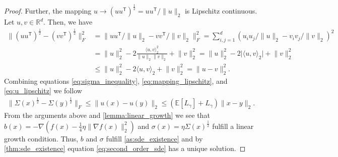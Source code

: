 \documentclass[12pt]{article}
\theoremstyle{definition}
\numberwithin{equation}{section}
\newcommand{\R}{\mathbb{R}}
\newcommand{\T}{\mathsf{T}}
\newcommand{\ev}[1]{\mathbb{E}\left[{#1}\right]}
\newcommand{\norm}[1]{\lVert{#1}\rVert_2}
\newcommand{\normf}[1]{\lVert{#1}\rVert_F}
\newcommand{\scp}[2]{\langle{#1}, {#2}\rangle_2}
\begin{document}
\begin{proof}
  Further, the mapping $u \rightarrow (uu^\T)^{\frac{1}{2}} = uu^\T/\norm{u}$ is Lipschitz continuous. Let $u,v \in \R^d$. Then, we have
  \begin{equation}
    \label{eq:mapping_lipschitz}
    \begin{split}
    \normf{(uu^\T)^{\frac{1}{2}} - (vv^\T)^{\frac{1}{2}}}^2 &= \normf{uu^\T/\norm{u} - vv^\T/\norm{v}}^2 = \sum_{i,j = 1}^d (u_iu_j/\norm{u} - v_iv_j/\norm{v})^2 \\
    &= \norm{u}^2 - 2 \frac{\scp{u}{v}^2}{\norm{u}\norm{v}} + \norm{v}^2 = \norm{u}^2 - 2 \lvert \scp{u}{v} \rvert+ \norm{v}^2 \\
    &\leq \norm{u}^2 - 2 \scp{u}{v} + \norm{v}^2 = \norm{u-v}^2.
    \end{split}
  \end{equation}
  Combining equations \eqref{eq:sigma_inequality}, \eqref{eq:mapping_lipschitz}, and \eqref{eq:u_lipschitz} we follow
  \begin{align*}
    \normf{\Sigma(x)^{\frac{1}{2}} - \Sigma(y)^{\frac{1}{2}}} \leq \norm{u(x) - u(y)} \leq \left(\ev{L_{\gamma}} + L_{\gamma}\right)\norm{x-y}.
  \end{align*}
  From the arguments above and \autoref{lemma:linear_growth} we see that $b(x) = -\nabla \left( f(x) - \frac{1}{4}\eta \norm{\nabla f(x)}^2\right)$ and $\sigma(x) = \eta \Sigma(x)^{\frac{1}{2}}$ fulfill a linear growth condition. Thus, $b$ and $\sigma$ fulfill \autoref{as:sde_existence} and by \autoref{thm:sde_existence} equation \eqref{eq:second_order_sde} has a unique solution.


\end{proof}
\end{document}
